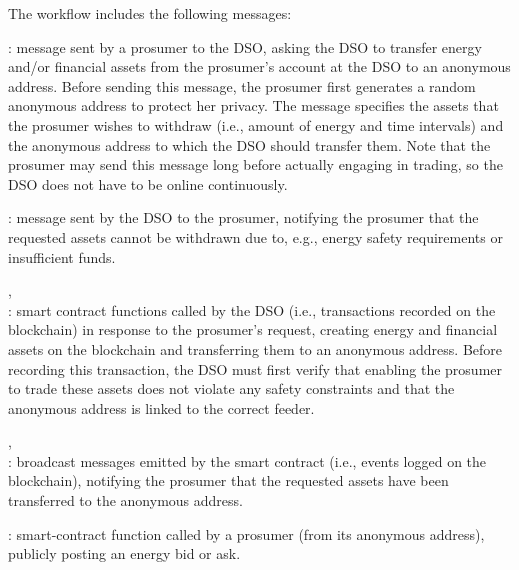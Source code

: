 The workflow includes the following messages:
\begin{compactitem}
\item 
{}: message sent by a prosumer to the DSO, asking the DSO to transfer energy and/or financial assets from the prosumer's account at the DSO to an anonymous address.
Before sending this message, the prosumer first generates a random anonymous address to protect her privacy.
The message specifies the assets that the prosumer wishes to withdraw (i.e., amount of energy and time intervals) and the anonymous address to which the DSO should transfer them.
Note that the prosumer may send this message long before actually engaging in trading, so the DSO does not have to be online continuously.
\item {}: message sent by the DSO to the prosumer,
notifying the prosumer that the requested assets cannot be withdrawn due to, e.g., energy safety requirements or insufficient funds.
\item {},\\:
smart contract functions called by the DSO (i.e., transactions recorded on the blockchain) in response to the prosumer's request, creating energy and financial assets on the blockchain and transferring them to an anonymous address.
Before recording this transaction, the DSO must first verify that enabling the prosumer to trade these assets does not violate any safety constraints and that the anonymous address is linked to the correct feeder.
\item {},\\: broadcast messages emitted by the smart contract (i.e., events logged on the blockchain),
notifying the prosumer that the requested assets have been transferred to the anonymous address.
\item {}: smart-contract function called by a prosumer (from its anonymous address), publicly posting an energy bid or ask.

\end{compactitem}
